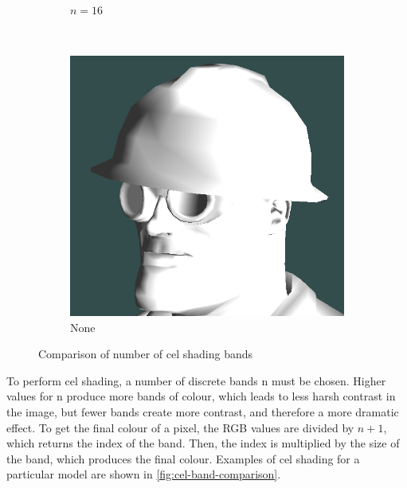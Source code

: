 \begin{figure}[h]
\begin{subfigure}[b]{0.15\textwidth}
        \caption{$n = 16$}
        \label{fig:cel-shading-n16}
    \end{subfigure}
    ~
    \begin{subfigure}[b]{0.15\textwidth}
        \includegraphics[width=\textwidth]{img/cel-shading-none.png}
        \caption{None}
        \label{fig:cel-shading-none}
    \end{subfigure}
    \caption{Comparison of number of cel shading bands}
    \label{fig:cel-band-comparison}
\end{figure}


To perform cel shading, a number of discrete bands n must be chosen. Higher values for n produce more 
bands of colour, which leads to less harsh contrast in the image, but fewer bands create more contrast,
and therefore a more dramatic effect. To get the final colour of a pixel, the RGB values are divided by
$n+1$, which returns the index of the band. Then, the index is multiplied by the size of the band, which
produces the final colour. Examples of cel shading for a particular model are shown in 
\autoref{fig:cel-band-comparison}. 

